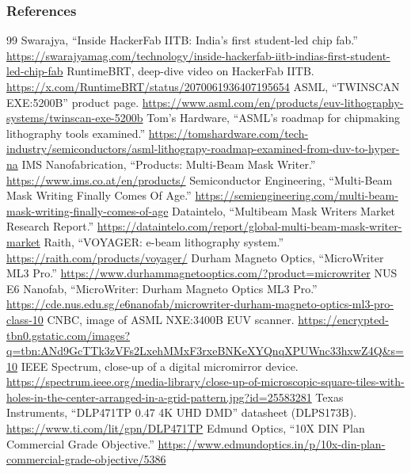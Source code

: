 \documentclass[9pt, compress, aspectratio=169]{beamer}
\begin{document}
\begin{frame}[t, allowframebreaks]
  \frametitle{References}
  \begin{thebibliography}{99}
     Swarajya, ``Inside HackerFab IITB: India's first student-led chip fab.'' \url{https://swarajyamag.com/technology/inside-hackerfab-iitb-indias-first-student-led-chip-fab}
     RuntimeBRT, deep-dive video on HackerFab IITB. \url{https://x.com/RuntimeBRT/status/2070061936407195654}
     ASML, ``TWINSCAN EXE:5200B'' product page. \url{https://www.asml.com/en/products/euv-lithography-systems/twinscan-exe-5200b}
     Tom's Hardware, ``ASML's roadmap for chipmaking lithography tools examined.'' \url{https://tomshardware.com/tech-industry/semiconductors/asml-lithograpy-roadmap-examined-from-duv-to-hyper-na}
     IMS Nanofabrication, ``Products: Multi-Beam Mask Writer.'' \url{https://www.ims.co.at/en/products/}
     Semiconductor Engineering, ``Multi-Beam Mask Writing Finally Comes Of Age.'' \url{https://semiengineering.com/multi-beam-mask-writing-finally-comes-of-age}
     Dataintelo, ``Multibeam Mask Writers Market Research Report.'' \url{https://dataintelo.com/report/global-multi-beam-mask-writer-market}
     Raith, ``VOYAGER: e-beam lithography system.'' \url{https://raith.com/products/voyager/}
     Durham Magneto Optics, ``MicroWriter ML3 Pro.'' \url{https://www.durhammagnetooptics.com/?product=microwriter}
     NUS E6 Nanofab, ``MicroWriter: Durham Magneto Optics ML3 Pro.'' \url{https://cde.nus.edu.sg/e6nanofab/microwriter-durham-magneto-optics-ml3-pro-class-10}
     CNBC, image of ASML NXE:3400B EUV scanner. \url{https://encrypted-tbn0.gstatic.com/images?q=tbn:ANd9GcTTk3zVFs2LxehMMxF3rxeBNKeXYQnqXPUWnc33hxwZ4Q&s=10}
     IEEE Spectrum, close-up of a digital micromirror device. \url{https://spectrum.ieee.org/media-library/close-up-of-microscopic-square-tiles-with-holes-in-the-center-arranged-in-a-grid-pattern.jpg?id=25583281}
     Texas Instruments, ``DLP471TP 0.47 4K UHD DMD'' datasheet (DLPS173B). \url{https://www.ti.com/lit/gpn/DLP471TP}
     Edmund Optics, ``10X DIN Plan Commercial Grade Objective.'' \url{https://www.edmundoptics.in/p/10x-din-plan-commercial-grade-objective/5386}
  \end{thebibliography}
\end{frame}
\end{document}
